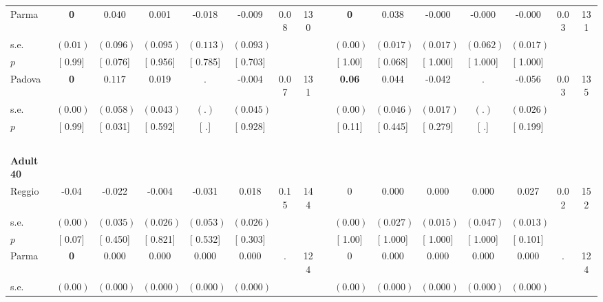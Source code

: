 \begin{longtable}{L{8em} c c c c c c c p{1em} c c c c c c c}
\quad \quad \quad Parma& \textbf{0} & $ \mathbf{    0.040}$ &     0.001 &    -0.018 &    -0.009 &      0.08 &       130 & & \textbf{0} & $ \mathbf{    0.038}$ &    -0.000 &    -0.000 &    -0.000 &      0.03 &       131  \\*
\quad \quad \quad \quad s.e.& $ (     0.01)$ & $ (    0.096)$ & $ (    0.095)$ & $ (    0.113)$ & $ (    0.093)$ & & & & $ (     0.00)$ & $ (    0.017)$ & $ (    0.017)$ & $ (    0.062)$ & $ (    0.017)$ & &  \\*
\quad \quad \quad \quad $ p$ & [     0.99] & [    0.076] & [    0.956] & [    0.785] & [    0.703] & & & & [     1.00] & [    0.068] & [    1.000] & [    1.000] & [    1.000] & &  \\[1em]
\quad \quad \quad Padova& \textbf{0} & $ \mathbf{    0.117}$ &     0.019 &         . &    -0.004 &      0.07 &       131 & & \textbf{     0.06} &     0.044 &    -0.042 &         . &    -0.056 &      0.03 &       135  \\*
\quad \quad \quad \quad s.e.& $ (     0.00)$ & $ (    0.058)$ & $ (    0.043)$ & $ (        .)$ & $ (    0.045)$ & & & & $ (     0.00)$ & $ (    0.046)$ & $ (    0.017)$ & $ (        .)$ & $ (    0.026)$ & &  \\*
\quad \quad \quad \quad $ p$ & [     0.99] & [    0.031] & [    0.592] & [        .] & [    0.928] & & & & [     0.11] & [    0.445] & [    0.279] & [        .] & [    0.199] & &  \\[1em]
~\\[1em]
\quad \quad \textbf{Adult 40} & & & & & & & & & & & & & & & \\* 
\quad \quad \quad Reggio& -0.04 &    -0.022 &    -0.004 &    -0.031 &     0.018 &      0.15 &       144 & & 0 &     0.000 &     0.000 &     0.000 &     0.027 &      0.02 &       152  \\*
\quad \quad \quad \quad s.e.& $ (     0.00)$ & $ (    0.035)$ & $ (    0.026)$ & $ (    0.053)$ & $ (    0.026)$ & & & & $ (     0.00)$ & $ (    0.027)$ & $ (    0.015)$ & $ (    0.047)$ & $ (    0.013)$ & &  \\*
\quad \quad \quad \quad $ p$ & [     0.07] & [    0.450] & [    0.821] & [    0.532] & [    0.303] & & & & [     1.00] & [    1.000] & [    1.000] & [    1.000] & [    0.101] & &  \\[1em]
\quad \quad \quad Parma& \textbf{0} &     0.000 &     0.000 &     0.000 &     0.000 &         . &       124 & & 0 &     0.000 &     0.000 &     0.000 &     0.000 &         . &       124  \\*
\quad \quad \quad \quad s.e.& $ (     0.00)$ & $ (    0.000)$ & $ (    0.000)$ & $ (    0.000)$ & $ (    0.000)$ & & & & $ (     0.00)$ & $ (    0.000)$ & $ (    0.000)$ & $ (    0.000)$ & $ (    0.000)$ & &  \\*

\end{longtable}
